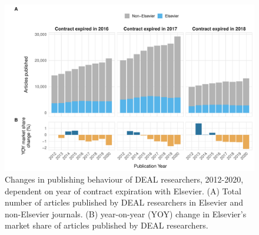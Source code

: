 \documentclass[
]{article}
\begin{document}
\begin{figure}

{\centering \includegraphics[width=0.75\linewidth]{analysis_files/figure-latex/items-publisher-year-cancellation-1} 

}

\caption{Changes in publishing behaviour of DEAL researchers, 2012-2020, dependent on year of contract expiration with Elsevier. (A) Total number of articles published by DEAL researchers in Elsevier and non-Elsevier journals. (B) year-on-year (YOY) change in Elsevier's market share of articles published by DEAL researchers.}\label{fig:items-publisher-year-cancellation}
\end{figure}
\end{document}
